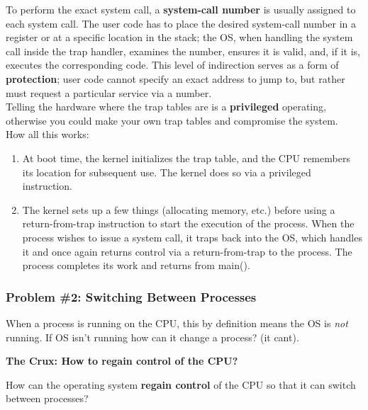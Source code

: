 To perform the exact system call, a \textbf{system-call number} is usually 
assigned to each system call. The user code has to place the desired system-call
number in a register or at a specific location in the stack; the OS, when
handling the system call inside the trap handler, examines the number,
ensures it is valid, and, if it is, executes the corresponding code. This
level of indirection serves as a form of \textbf{protection}; user code cannot
specify an exact address to jump to, but rather must request a particular 
service via a number.\\

Telling the hardware where the trap tables are is a \textbf{privileged} 
operating, otherwise you could make your own trap tables and compromise the
system.\\

How all this works:

\begin{enumerate}
    \item At boot time, the kernel initializes the trap table, and the CPU
        remembers its location for subsequent use. The kernel does so via
        a privileged instruction.
    \item The kernel sets up a few things (allocating memory, etc.) before
        using a return-from-trap instruction to start the execution of the 
        process. When the process wishes to issue a system call, it traps back
        into the OS, which handles it and once again returns control via a 
        return-from-trap to the process. The process completes its work and 
        returns from main().
\end{enumerate}

\subsubsection{Problem \#2: Switching Between Processes}

When a process is running on the CPU, this by definition means the OS is
\textit{not} running. If OS isn't running how can
it change a process? (it cant).\\

\begin{tcolorbox}
    \textbf{The Crux: How to regain control of the CPU?}

    How can the operating system \textbf{regain control} of the CPU so that it can
    switch between processes?
\end{tcolorbox}

